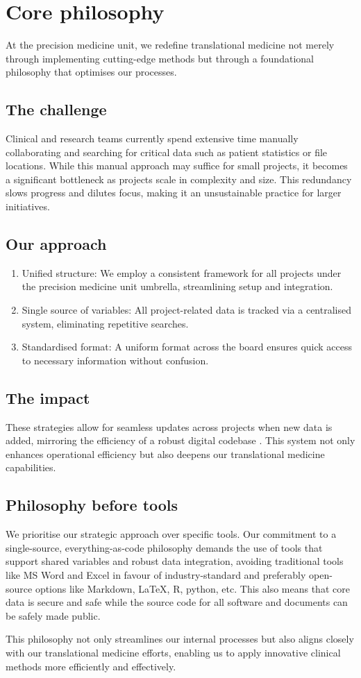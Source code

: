 \section{Core philosophy}
At the precision medicine unit, we redefine translational medicine not merely through implementing cutting-edge methods but through a foundational philosophy that optimises our processes.

\subsection*{The challenge}
Clinical and research teams currently spend extensive time manually collaborating and searching for critical data such as patient statistics or file locations. 
While this manual approach may suffice for small projects, it becomes a significant bottleneck as projects scale in complexity and size. 
This redundancy slows progress and dilutes focus, making it an unsustainable practice for larger initiatives.

\subsection*{Our approach}
\begin{enumerate}
\item  Unified structure: We employ a consistent framework for all projects under the precision medicine unit umbrella, streamlining setup and integration.
\item Single source of variables: All project-related data is tracked via a centralised system, eliminating repetitive searches.
\item Standardised format: A uniform format across the board ensures quick access to necessary information without confusion.
\end{enumerate}

\subsection*{The impact}
These strategies allow for seamless updates across projects when new data is added, mirroring the efficiency of a robust digital codebase 
\citep{potvin_levenberg_google_ACM}. 
This system not only enhances operational efficiency but also deepens our translational medicine capabilities.

\subsection*{Philosophy before tools}
We prioritise our strategic approach over specific tools. 
Our commitment to a single-source, everything-as-code philosophy demands the use of tools that support shared variables and robust data integration, avoiding traditional tools like MS Word and Excel in favour of industry-standard and preferably open-source options like Markdown, LaTeX, R, python, etc.
This also means that core data is secure and safe while the source code for all software and documents can be safely made public.

This philosophy not only streamlines our internal processes but also aligns closely with our translational medicine efforts, enabling us to apply innovative clinical methods more efficiently and effectively.
